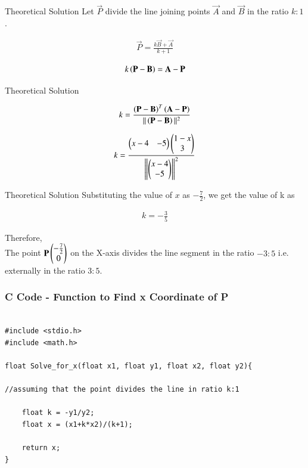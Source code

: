 \documentclass{beamer}
\begin{document}
\begin{frame}{Theoretical Solution}
Let $\vec{P}$ divide the line joining points $\vec{A}$ and $\vec{B}$ in the ratio $k:1$. 

\begin{align}
    \vec{P}=\frac{k\vec{B}+\vec{A}}{k+1}
\end{align}

\begin{align}
    k\left(\mathbf{P}- \mathbf{B}\right) = \mathbf{A}-\mathbf{P}
\end{align}

\end{frame}

\begin{frame}{Theoretical Solution}

\begin{align}
    k=\frac{\left(\mathbf{P}-\mathbf{B}\right)^T\left(\mathbf{A}-\mathbf{P}\right)}{||\left(\mathbf{P}-\mathbf{B}\right)||^2}
\end{align}

\begin{align}
      k=\frac{\begin{pmatrix}x-4 & -5\end{pmatrix}\begin{pmatrix}1-x\\3\end{pmatrix}}{{\left\lVert\begin{pmatrix}x-4 \\ -5\end{pmatrix}\right\rVert}^2}
\end{align}

\end{frame}

\begin{frame}{Theoretical Solution}
    Substituting the value of $x$ as $-\frac{7}{2}$, we get the value of k as

\begin{align}
    k=-\frac{3}{5}
\end{align}

Therefore,\\

The point $\mathbf{P}\begin{pmatrix}-\frac{7}{2}\\0\end{pmatrix}$ on the X-axis divides the line segment in the ratio $-3:5$ i.e. externally in the ratio $3:5$.
\end{frame}

\begin{frame}[fragile]
    \frametitle{C Code - Function to Find x Coordinate of P}

    \begin{lstlisting}

#include <stdio.h>
#include <math.h>

float Solve_for_x(float x1, float y1, float x2, float y2){

//assuming that the point divides the line in ratio k:1

	float k = -y1/y2;
	float x = (x1+k*x2)/(k+1);

	return x;
}
    \end{lstlisting}

\end{frame}
\end{document}
